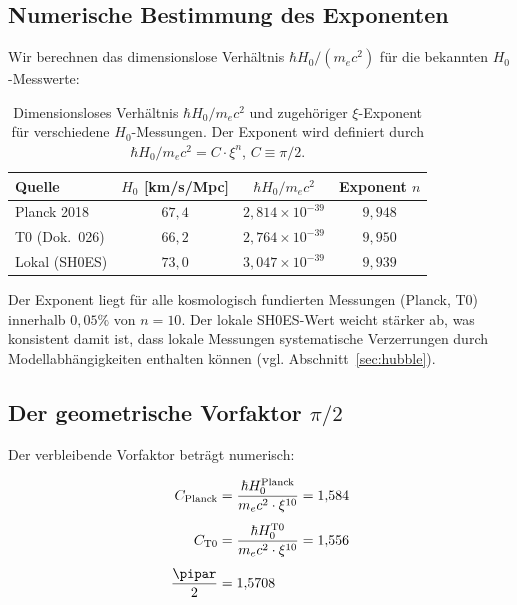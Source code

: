 \subsection{Numerische Bestimmung des Exponenten}

Wir berechnen das dimensionslose Verhältnis $\hbar H_0 / (m_e c^2)$ für die
bekannten $H_0$-Messwerte:

\begin{table}[H]
    \centering
    \begin{tabular}{lccc}
        \toprule
        \textbf{Quelle} & \textbf{$H_0$ [km/s/Mpc]} &
        \textbf{$\hbar H_0 / m_e c^2$} & \textbf{Exponent $n$} \\
        \midrule
        Planck 2018    & $67{,}4$ & $2{,}814 \times 10^{-39}$ & $9{,}948$ \\
        T0 (Dok.~026)  & $66{,}2$ & $2{,}764 \times 10^{-39}$ & $9{,}950$ \\
        Lokal (SH0ES)  & $73{,}0$ & $3{,}047 \times 10^{-39}$ & $9{,}939$ \\
        \bottomrule
    \end{tabular}
    \caption{Dimensionsloses Verhältnis $\hbar H_0 / m_e c^2$ und zugehöriger
    $\xi$-Exponent für verschiedene $H_0$-Messungen.
    Der Exponent wird definiert durch $\hbar H_0 / m_e c^2 = C \cdot \xi^n$,
    $C \equiv \pi/2$.}
    \label{tab:exponents}
\end{table}

Der Exponent liegt für alle kosmologisch fundierten Messungen (Planck, T0)
innerhalb $0{,}05\%$ von $n = 10$. Der lokale SH0ES-Wert weicht stärker ab,
was konsistent damit ist, dass lokale Messungen systematische Verzerrungen
durch Modellabhängigkeiten enthalten können (vgl. Abschnitt~\ref{sec:hubble}).

\subsection{Der geometrische Vorfaktor \texorpdfstring{$\pi/2$}{pi/2}}

Der verbleibende Vorfaktor beträgt numerisch:

\begin{align}
    C_{\text{Planck}} &= \frac{\hbar H_0^{\text{Planck}}}{m_e c^2 \cdot \xi^{10}}
    = 1{,}584 \\[4pt]
    C_{\text{T0}}     &= \frac{\hbar H_0^{\text{T0}}}{m_e c^2 \cdot \xi^{10}}
    = 1{,}556 \\[4pt]
    \frac{\pipar}{2}     &= 1{,}5708
\end{align}

